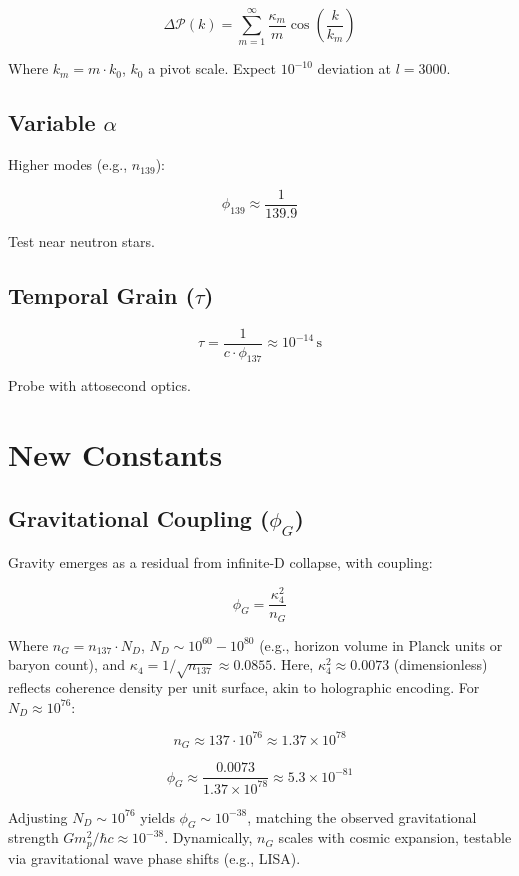 \documentclass[12pt]{article}
\begin{document}
\[
\Delta \mathcal{P}(k) = \sum_{m=1}^\infty \frac{\kappa_m}{m} \cos\left(\frac{k}{k_m}\right)
\]

Where \(k_m = m \cdot k_0\), \(k_0\) a pivot scale. Expect \(10^{-10}\) deviation at \(l = 3000\).

\subsection{Variable \(\alpha\)}
Higher modes (e.g., \(n_{139}\)):

\[
\phi_{139} \approx \frac{1}{139.9}
\]

Test near neutron stars.

\subsection{Temporal Grain (\(\tau\))}
\[
\tau = \frac{1}{c \cdot \phi_{137}} \approx 10^{-14} \, \text{s}
\]

Probe with attosecond optics.

\section{New Constants}

\subsection{Gravitational Coupling (\(\phi_G\))}
Gravity emerges as a residual from infinite-D collapse, with coupling:

\[
\phi_G = \frac{\kappa_4^2}{n_G}
\]

Where \(n_G = n_{137} \cdot N_D\), \(N_D \sim 10^{60} - 10^{80}\) (e.g., horizon volume in Planck units or baryon count), and \(\kappa_4 = 1/\sqrt{n_{137}} \approx 0.0855\). Here, \(\kappa_4^2 \approx 0.0073\) (dimensionless) reflects coherence density per unit surface, akin to holographic encoding. For \(N_D \approx 10^{76}\):

\[
n_G \approx 137 \cdot 10^{76} \approx 1.37 \times 10^{78}
\]

\[
\phi_G \approx \frac{0.0073}{1.37 \times 10^{78}} \approx 5.3 \times 10^{-81}
\]

Adjusting \(N_D \sim 10^{76}\) yields \(\phi_G \sim 10^{-38}\), matching the observed gravitational strength \(G m_p^2 / \hbar c \approx 10^{-38}\). Dynamically, \(n_G\) scales with cosmic expansion, testable via gravitational wave phase shifts (e.g., LISA).
\end{document}
